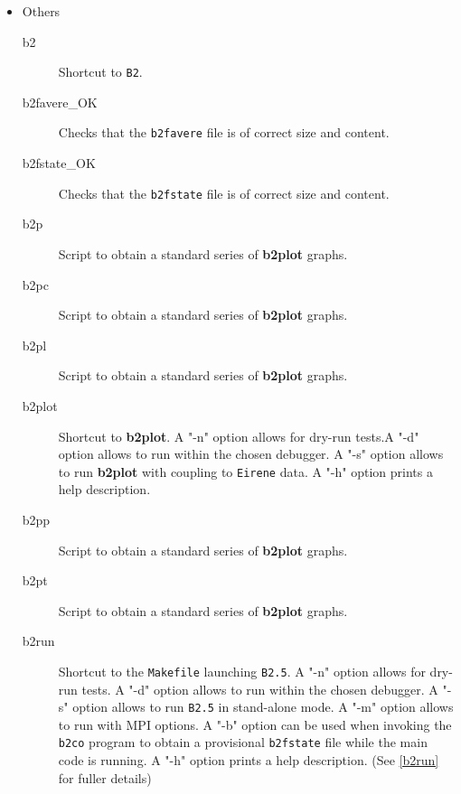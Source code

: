 \documentclass[a4paper,10pt]{report}
\newcommand{\btwoplot}{{\bf b2plot} }
\newcommand{\btwoplotns}{{\bf b2plot}}
\begin{document}
\begin{itemize}
\item Others
  \begin{description}
  \item[b2] Shortcut to {\tt B2}.
  \item[b2favere\_OK] Checks that the {\tt b2favere} file
    is of correct size and content.
  \item[b2fstate\_OK] Checks that the {\tt b2fstate} file
    is of correct size and content.
  \item[b2p] Script to obtain a standard series of \btwoplot graphs.
  \item[b2pc] Script to obtain a standard series of \btwoplot graphs.
  \item[b2pl] Script to obtain a standard series of \btwoplot graphs.
  \item[b2plot] Shortcut to \btwoplotns. A "-n" option allows for dry-run tests.A "-d" option allows to run within the chosen debugger. A "-s" option allows to run \btwoplot with coupling to {\tt Eirene} data. A "-h" option prints a help description.
  \item[b2pp] Script to obtain a standard series of \btwoplot graphs.
  \item[b2pt] Script to obtain a standard series of \btwoplot graphs.
  \item[b2run] Shortcut to the {\tt Makefile} launching {\tt B2.5}. A "-n" option allows for dry-run tests. A "-d" option allows to run within the chosen debugger. A "-s" option allows to run {\tt B2.5} in stand-alone mode. A "-m" option allows to run with MPI options. A "-b" option can be used when invoking the {\tt b2co} program to obtain a provisional {\tt b2fstate} file while the main code is running. A "-h" option prints a help description. (See \ref{b2run} for fuller details)

\end{description}
\end{itemize}
\end{document}
